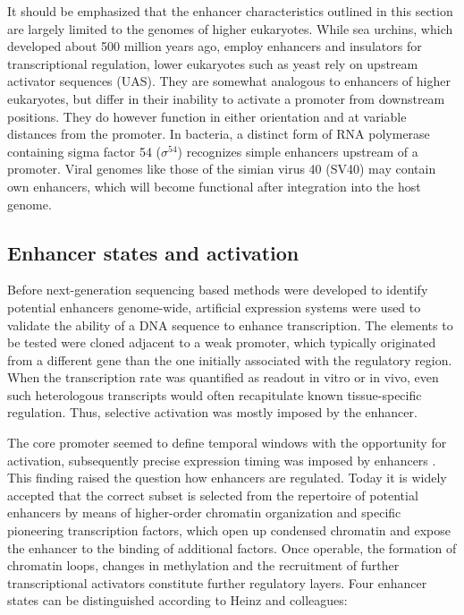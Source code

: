 It should be emphasized that the enhancer characteristics outlined in this section are largely limited to the genomes of higher eukaryotes. While sea urchins, which developed about 500 million years ago, employ enhancers\cite{Grosschedl1980,Palla1994} and insulators\cite{Palla1997} for transcriptional regulation, lower eukaryotes such as yeast rely on upstream activator sequences (UAS)\cite{West1984,Bram1986,Webster1988}. They are somewhat analogous to enhancers of higher eukaryotes, but differ in their inability to activate a promoter from downstream positions. They do however function in either orientation and at variable distances from the promoter. In bacteria, a distinct form of RNA polymerase containing sigma factor 54 (\ensuremath{\sigma^{54}}) recognizes simple enhancers upstream of a promoter\cite{Morett1993}. Viral genomes like those of the simian virus 40 (SV40) may contain own enhancers, which will become functional after integration into the host genome\cite{Khoury1983,Zenke1986,Ondek1988}. 


\subsection{Enhancer states and activation} 
\label{chap:i:enhancers:states}

Before next-generation sequencing based methods were developed to identify potential enhancers genome-wide, artificial expression systems were used to validate the ability of a DNA sequence to enhance transcription. The elements to be tested were cloned adjacent to a weak promoter, which typically originated from a different gene than the one initially associated with the regulatory region\cite{Banerji1983,Gillies1983}. When the transcription rate was quantified as readout in vitro or in vivo, even such heterologous transcripts would often recapitulate known tissue-specific regulation. Thus, selective activation was mostly imposed by the enhancer\cite{Grosveld1987,Greaves1989}. 

The core promoter seemed to define temporal windows with the opportunity for activation, subsequently precise expression timing was imposed by enhancers \cite{Batut2017}. This finding raised the question how enhancers are regulated. Today it is widely accepted that the correct subset is selected from the repertoire of potential enhancers by means of higher-order chromatin organization and specific pioneering transcription factors, which open up condensed chromatin and expose the enhancer to the binding of additional factors. Once operable, the formation of chromatin loops, changes in methylation and the recruitment of further transcriptional activators constitute further regulatory layers. Four enhancer states can be distinguished according to Heinz and colleagues\cite{Heinz2015}:

